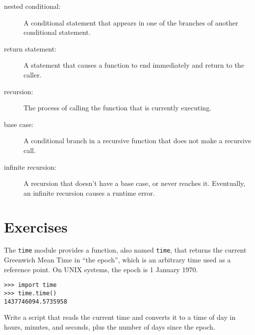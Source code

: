 \begin{description}
\item[nested conditional:]  A conditional statement that appears
in one of the branches of another conditional statement.

\item[return statement:] A statement that causes a function to
end immediately and return to the caller.

\item[recursion:]  The process of calling the function that is
currently executing.

\item[base case:]  A conditional branch in a
recursive function that does not make a recursive call.

\item[infinite recursion:]  A recursion that doesn't have a
base case, or never reaches it.  Eventually, an infinite recursion
causes a runtime error.

\end{description}

\section{Exercises}

\begin{exercise}

The {\tt time} module provides a function, also named {\tt time}, that
returns the current Greenwich Mean Time in ``the epoch'', which is
an arbitrary time used as a reference point.  On UNIX systems, the
epoch is 1 January 1970.

\begin{verbatim}
>>> import time
>>> time.time()
1437746094.5735958
\end{verbatim}

Write a script that reads the current time and converts it to
a time of day in hours, minutes, and seconds, plus the number of
days since the epoch.

\end{exercise}



